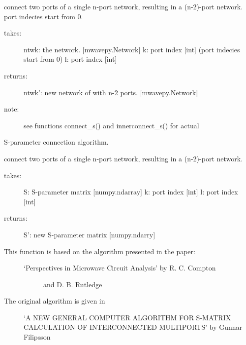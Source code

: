 \documentclass[letterpaper,10pt,english]{sphinxmanual}
\begin{document}

\begin{fulllineitems}
\label{api/mwavepy:mwavepy.network.innerconnect}
connect two ports of a single n-port network, resulting in a 
(n-2)-port network. port indecies start from 0.
\begin{description}
\item[{takes:}] \leavevmode
ntwk: the network. {[}mwavepy.Network{]}
k: port index {[}int{]} (port indecies start from 0)
l: port index {[}int{]}

\item[{returns:}] \leavevmode
ntwk': new network of with n-2 ports. {[}mwavepy.Network{]}

\item[{note:}] \leavevmode
see functions connect\_s() and innerconnect\_s() for actual

\end{description}

S-parameter connection algorithm.

\end{fulllineitems}


\begin{fulllineitems}
\label{api/mwavepy:mwavepy.network.innerconnect_s}
connect two ports of a single n-port network, resulting in a 
(n-2)-port network.
\begin{description}
\item[{takes:}] \leavevmode
S: S-parameter matrix {[}numpy.ndarray{]} 
k: port index {[}int{]}
l: port index {[}int{]}

\item[{returns:}] \leavevmode
S': new S-parameter matrix {[}numpy.ndarry{]}

\item[{This function is based on the algorithm presented in the paper:}] \leavevmode\begin{description}
\item[{`Perspectives in Microwave Circuit Analysis' by R. C. Compton}] \leavevmode
and D. B. Rutledge

\end{description}

\item[{The original algorithm is given in }] \leavevmode
`A NEW GENERAL COMPUTER ALGORITHM FOR S-MATRIX CALCULATION OF
INTERCONNECTED MULTIPORTS' by Gunnar Filipsson

\end{description}

\end{fulllineitems}
\end{document}
